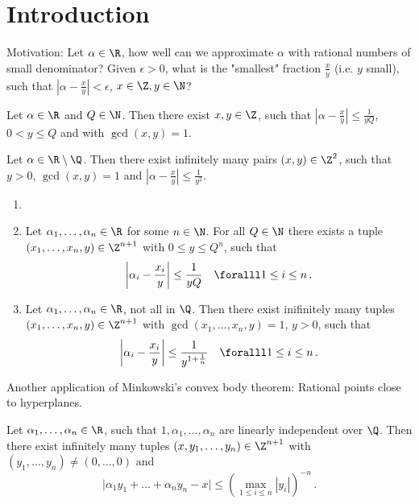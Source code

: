 \section{Introduction}

Motivation: Let \( \alpha \in \R \), how well can we approximate \( \alpha \) with rational numbers of small denominator?
Given \( \epsilon>0 \), what is the "smallest" fraction \( \frac{x}{y} \) (i.e. \( y \) small), such that \( \left| \alpha - \frac{x}{y} \right| < \epsilon \), \( x \in \Z, y \in \N \)?

\begin{thmn}[Dirichlet, 1842]
	Let \( \alpha \in \R \) and \( Q \in \N \).
	Then there exist \( x,y \in \Z \), such that \( \left| \alpha - \frac{x}{y} \right| \leq \frac{1}{yQ} \), \( 0 < y \leq Q \) and with \( \gcd(x,y) = 1 \).
\end{thmn}

\begin{cor}\label{thm:4.2}
	Let \( \alpha \in \R \setminus \Q \).
	Then there exist infinitely many pairs \( (x,y) \in \Z^2 \), such that \( y > 0 \), \( \gcd(x,y)=1 \) and \( \left| \alpha - \frac{x}{y} \right| \leq \frac{1}{y^2} \).
\end{cor}

\begin{thmn}[Dirichlet, 1842] \label{thm:dirichlet_solutions}
	\begin{enumerate}[label=(\alph*)]
		\item[]
		\item Let \( \alpha_1, \dotsc, \alpha_n \in \R \) for some \( n \in \N \).
			For all \( Q \in \N \) there exists a tuple \( (x_1, \dotsc, x_n, y) \in \Z^{n+1} \) with \( 0 \leq y \leq Q^n \), such that
			\[ \left| \alpha_i - \frac{x_i}{y} \right| \leq \frac{1}{yQ} \quad \foralll 1 \leq i \leq n \,. \]
		\item Let \( \alpha_1, \dotsc, \alpha_n \in \R \), not all in \( \Q \).
			Then there exist inifinitely many tuples \( (x_1, \dotsc, x_n, y) \in \Z^{n+1} \) with \( \gcd(x_1, \dotsc, x_n, y) = 1 \), \( y>0 \), such that
			\[ \left| \alpha_i - \frac{x_i}{y} \right| \leq \frac{1}{y^{1 + \frac{1}{n}}} \quad \foralll 1 \leq i \leq n \,. \]
	\end{enumerate}
\end{thmn}

Another application of Minkowski's convex body theorem: Rational points close to hyperplanes.

\begin{thmn}
	Let \( \alpha_1, \dotsc, \alpha_n \in \R \), such that \( 1, \alpha_1, \dotsc, \alpha_n \) are linearly independent over \( \Q \).
	Then there exist infinitely many tuples \( (x, y_1, \dotsc, y_n) \in \Z^{n+1} \) with \( (y_1, \dotsc, y_n) \neq (0, \dotsc, 0) \) and
	\[ \big| \alpha_1 y_1 + \dots + \alpha_n y_n - x \big| \leq \left( \max_{1 \leq i \leq n} |y_i| \right)^{-n} \,. \]
\end{thmn}

